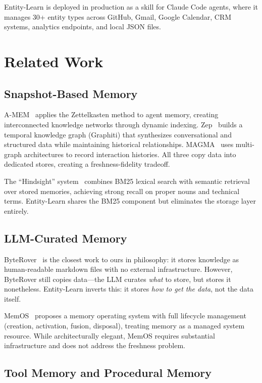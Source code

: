 \documentclass[11pt,twocolumn]{article}
\begin{document}
Entity-Learn is deployed in production as a skill for Claude Code agents, where it manages 30+ entity types across GitHub, Gmail, Google Calendar, CRM systems, analytics endpoints, and local JSON files.


\section{Related Work}
\label{sec:related}

\subsection{Snapshot-Based Memory}

A-MEM~\cite{amem2025} applies the Zettelkasten method to agent memory, creating interconnected knowledge networks through dynamic indexing.
Zep~\cite{zep2025} builds a temporal knowledge graph (Graphiti) that synthesizes conversational and structured data while maintaining historical relationships.
MAGMA~\cite{magma2026} uses multi-graph architectures to record interaction histories.
All three copy data into dedicated stores, creating a freshness-fidelity tradeoff.

The ``Hindsight'' system~\cite{hindsight2025} combines BM25 lexical search with semantic retrieval over stored memories, achieving strong recall on proper nouns and technical terms.
Entity-Learn shares the BM25 component but eliminates the storage layer entirely.

\subsection{LLM-Curated Memory}

ByteRover~\cite{byterover2026} is the closest work to ours in philosophy: it stores knowledge as human-readable markdown files with no external infrastructure.
However, ByteRover still copies data---the LLM curates \emph{what} to store, but stores it nonetheless.
Entity-Learn inverts this: it stores \emph{how to get the data}, not the data itself.

MemOS~\cite{memos2025} proposes a memory operating system with full lifecycle management (creation, activation, fusion, disposal), treating memory as a managed system resource.
While architecturally elegant, MemOS requires substantial infrastructure and does not address the freshness problem.

\subsection{Tool Memory and Procedural Memory}
\end{document}
